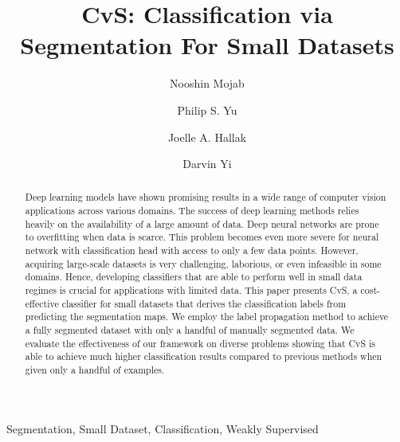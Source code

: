 \documentclass[conference]{IEEEtran}
\begin{document}
\title{CvS: Classification via Segmentation For Small Datasets}

\author[1]{Nooshin Mojab}
\author[1]{Philip S. Yu}
\author[2]{Joelle A. Hallak}
\author[2]{Darvin Yi}



\maketitle

\begin{abstract}
Deep learning models have shown promising results in a wide range of computer vision applications across various domains. The success of deep learning methods relies heavily on the availability of a large amount of data. Deep neural networks are prone to overfitting when data is scarce. This problem becomes even more severe for neural network with classification head with access to only a few data points. However, acquiring large-scale datasets is very challenging, laborious, or even infeasible in some domains. Hence, developing classifiers that are able to perform well in small data regimes is crucial for applications with limited data. This paper presents CvS, a cost-effective classifier for small datasets that derives the classification labels from predicting the segmentation maps. We employ the label propagation method to achieve a fully segmented dataset with only a handful of manually segmented data. We evaluate the effectiveness of our framework on diverse problems showing that CvS is able to achieve much higher classification results compared to previous methods when given only a handful of examples.
\end{abstract}

\begin{IEEEkeywords}
Segmentation, Small Dataset, Classification, Weakly Supervised
\end{IEEEkeywords}
\end{document}
